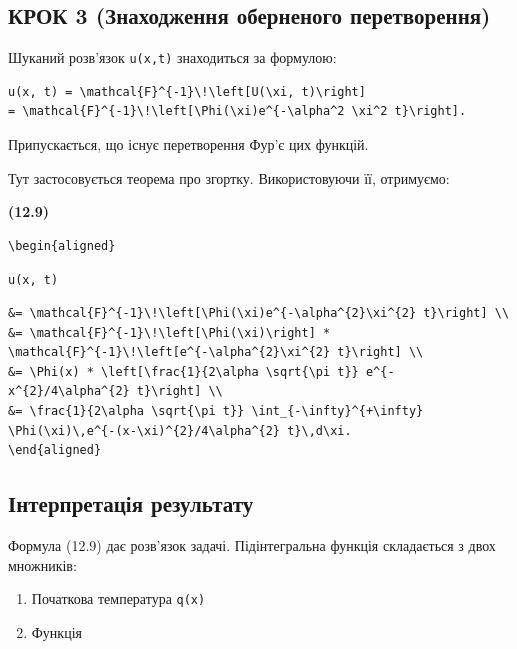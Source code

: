 \documentclass[
  ukrainian,
]{article}
\providecommand{\tightlist}{%
  \setlength{\itemsep}{0pt}\setlength{\parskip}{0pt}}
\begin{document}
\subsection{КРОК 3 (Знаходження оберненого
перетворення)}\label{ux43aux440ux43eux43a-3-ux437ux43dux430ux445ux43eux434ux436ux435ux43dux43dux44f-ux43eux431ux435ux440ux43dux435ux43dux43eux433ux43e-ux43fux435ux440ux435ux442ux432ux43eux440ux435ux43dux43dux44f}

Шуканий розв'язок \texttt{u(x,t)} знаходиться за формулою:

\begin{verbatim}
u(x, t) = \mathcal{F}^{-1}\!\left[U(\xi, t)\right]
= \mathcal{F}^{-1}\!\left[\Phi(\xi)e^{-\alpha^2 \xi^2 t}\right].
\end{verbatim}

Припускається, що існує перетворення Фур'є цих функцій.

Тут застосовується теорема про згортку. Використовуючи її, отримуємо:

\textbf{(12.9)}

\begin{verbatim}
\begin{aligned}
\end{verbatim}

\texttt{u(x,\ t)}

\begin{verbatim}
&= \mathcal{F}^{-1}\!\left[\Phi(\xi)e^{-\alpha^{2}\xi^{2} t}\right] \\
&= \mathcal{F}^{-1}\!\left[\Phi(\xi)\right] * \mathcal{F}^{-1}\!\left[e^{-\alpha^{2}\xi^{2} t}\right] \\
&= \Phi(x) * \left[\frac{1}{2\alpha \sqrt{\pi t}} e^{-x^{2}/4\alpha^{2} t}\right] \\
&= \frac{1}{2\alpha \sqrt{\pi t}} \int_{-\infty}^{+\infty} \Phi(\xi)\,e^{-(x-\xi)^{2}/4\alpha^{2} t}\,d\xi.
\end{aligned}
\end{verbatim}

\subsection{Інтерпретація
результату}\label{ux456ux43dux442ux435ux440ux43fux440ux435ux442ux430ux446ux456ux44f-ux440ux435ux437ux443ux43bux44cux442ux430ux442ux443}

Формула (12.9) дає розв'язок задачі. Підінтегральна функція складається
з двох множників:

\begin{enumerate}
\def\labelenumi{\arabic{enumi}.}
\tightlist
\item
  Початкова температура \texttt{q(x)}\\
\item
  Функція
\end{enumerate}
\end{document}
